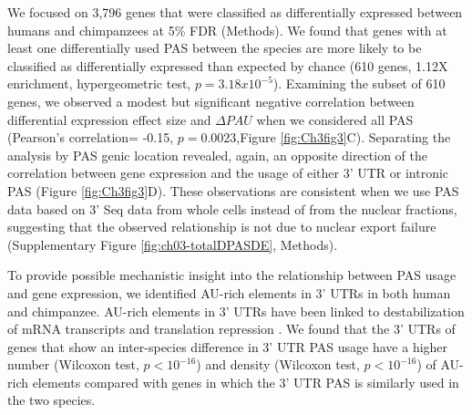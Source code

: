 We focused on 3,796 genes that were classified as differentially expressed between humans and chimpanzees at 5\% FDR (Methods). We found that genes with at least one differentially used PAS between the species are more likely to be classified as differentially expressed than expected by chance (610 genes, 1.12X enrichment, hypergeometric test, $p=3.18x10^{-5}$). Examining the subset of 610 genes, we observed a modest but significant negative correlation between differential expression effect size and $\Delta PAU$ when we considered all PAS (Pearson's correlation= -0.15, $p=0.0023$,Figure \ref{fig:Ch3fig3}C). Separating the analysis by PAS genic location revealed, again, an opposite direction of the correlation between gene expression and the usage of either 3' UTR or intronic PAS (Figure \ref{fig:Ch3fig3}D). These observations are consistent when we use PAS data based on 3' Seq data from whole cells instead of from the nuclear fractions, suggesting that the observed relationship is not due to nuclear export failure (Supplementary Figure \ref{fig:ch03-totalDPASDE}, Methods). 

To provide possible mechanistic insight into the relationship between PAS usage and gene expression, we identified AU-rich elements in 3' UTRs in both human and chimpanzee. AU-rich elements in 3' UTRs have been linked to destabilization of mRNA transcripts and translation repression \citep{floor_tunable_2016-1,moore_physiological_2014,siegel_massively_2020}. We found that the 3' UTRs of genes that show an inter-species difference in 3' UTR PAS usage have a higher number (Wilcoxon test, $p < 10^{-16}$) and density (Wilcoxon test, $p < 10^{-16}$) of AU-rich elements compared with genes in which the 3' UTR PAS is similarly used in the two species. 



